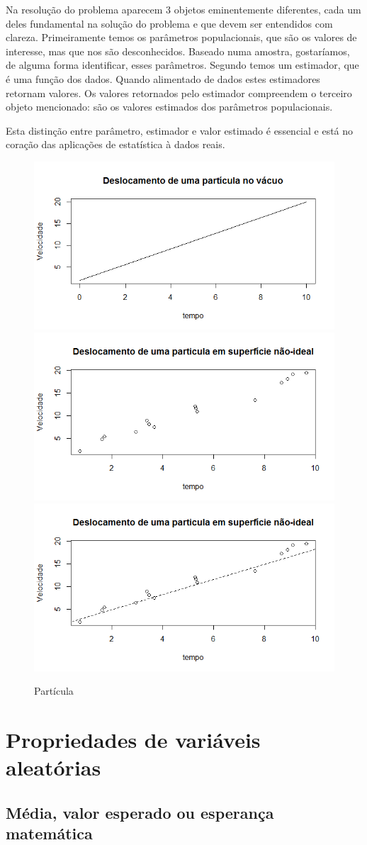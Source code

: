 \documentclass[
]{book}
\theoremstyle{definition}
\theoremstyle{definition}
\theoremstyle{definition}
\theoremstyle{remark}
\begin{document}
Na resolução do problema aparecem 3 objetos eminentemente diferentes, cada um deles fundamental na solução do problema e que devem ser entendidos com clareza. Primeiramente temos os parâmetros populacionais, que são os valores de interesse, mas que nos são desconhecidos. Baseado numa amostra, gostaríamos, de alguma forma identificar, esses parâmetros. Segundo temos um estimador, que é uma função dos dados. Quando alimentado de dados estes estimadores retornam valores. Os valores retornados pelo estimador compreendem o terceiro objeto mencionado: são os valores estimados dos parâmetros populacionais.

Esta distinção entre parâmetro, estimador e valor estimado é essencial e está no coração das aplicações de estatística à dados reais.

\begin{figure}
\includegraphics[width=0.3\linewidth]{Figuras/gfig1a} \includegraphics[width=0.3\linewidth]{Figuras/gfig1b} \includegraphics[width=0.3\linewidth]{Figuras/gfig1c} \caption{Partícula}\label{fig:gfig1}
\end{figure}

\hypertarget{propriedades-de-variuxe1veis-aleatuxf3rias}{%
\section{Propriedades de variáveis aleatórias}\label{propriedades-de-variuxe1veis-aleatuxf3rias}}

\hypertarget{muxe9dia-valor-esperado-ou-esperanuxe7a-matemuxe1tica}{%
\subsection{Média, valor esperado ou esperança matemática}\label{muxe9dia-valor-esperado-ou-esperanuxe7a-matemuxe1tica}}
\end{document}

